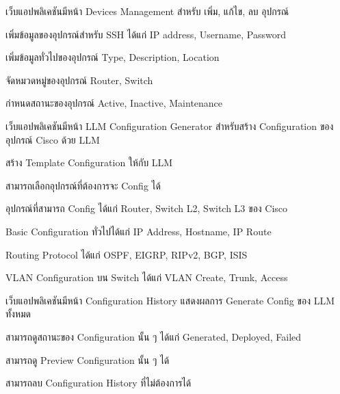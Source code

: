 \begin{mycustomenum2}
    \item เว็บแอปพลิเคชันมีหน้า Devices Management สำหรับ เพิ่ม, แก้ไข, ลบ อุปกรณ์
    \begin{mycustomenum2}
        \item เพิ่มข้อมูลของอุปกรณ์สำหรับ SSH ได้แก่ IP address, Username, Password
        \item เพิ่มข้อมูลทั่วไปของอุปกรณ์ Type, Description, Location 
        \item จัดหมวดหมู่ของอุปกรณ์ Router, Switch 
        \item กำหนดสถานะของอุปกรณ์ Active, Inactive, Maintenance
    \end{mycustomenum2}

    \item เว็บแอปพลิเคชันมีหน้า LLM Configuration Generator สำหรับสร้าง Configuration ของอุปกรณ์ Cisco ด้วย LLM 
    \begin{mycustomenum2}
        \item สร้าง Template Configuration ให้กับ LLM
        \item สามารถเลือกอุปกรณ์ที่ต้องการจะ Config ได้  
        \vspace{4em}
        \item อุปกรณ์ที่สามารถ Config ได้แก่ Router, Switch L2, Switch L3 ของ Cisco 
            \begin{mycustomenum2}
                \item Basic Configuration ทั่วไปได้แก่ IP Address, Hostname, IP Route 
                \item Routing Protocol ได้แก่ OSPF, EIGRP, RIPv2, BGP, ISIS 
                \item VLAN Configuration บน Switch ได้แก่ VLAN Create, Trunk, Access 
            \end{mycustomenum2} 
    \end{mycustomenum2}

    \item เว็บแอปพลิเคชันมีหน้า Configuration History แสดงผลการ Generate Config ของ LLM ทั้งหมด 
    \begin{mycustomenum2}
        \item สามารถดูสถานะของ Configuration นั้น ๆ ได้แก่ Generated, Deployed, Failed
        \item สามารถดู Preview Configuration นั้น ๆ ได้ 
        \item สามารถลบ Configuration History ที่ไม่ต้องการได้
    \end{mycustomenum2}


\end{mycustomenum2}

